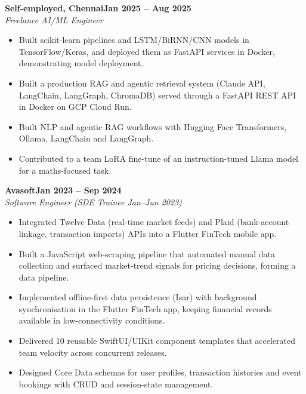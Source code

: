 \documentclass[a4paper,11pt]{article}
\newcommand{\entry}[4]{\needspace{4\baselineskip}\noindent\textbf{#1}\hfill\textbf{#2}\\ \textit{#3}\hfill\textit{#4}\par}
\begin{document}
\vspace{4pt}
\entry{Self-employed, Chennai}{Jan 2025 – Aug 2025}{Freelance AI/ML Engineer}{}
\begin{itemize}
  \item Built scikit-learn pipelines and LSTM/BiRNN/CNN models in TensorFlow/Keras, and deployed them as FastAPI services in Docker, demonstrating model deployment.
  \item Built a production RAG and agentic retrieval system (Claude API, LangChain, LangGraph, ChromaDB) served through a FastAPI REST API in Docker on GCP Cloud Run.
  \item Built NLP and agentic RAG workflows with Hugging Face Transformers, Ollama, LangChain and LangGraph.
  \item Contributed to a team LoRA fine-tune of an instruction-tuned Llama model for a maths-focused task.
\end{itemize}
\vspace{4pt}
\entry{Avasoft}{Jan 2023 – Sep 2024}{Software Engineer (SDE Trainee Jan–Jun 2023)}{}
\begin{itemize}
  \item Integrated Twelve Data (real-time market feeds) and Plaid (bank-account linkage, transaction imports) APIs into a Flutter FinTech mobile app.
  \item Built a JavaScript web-scraping pipeline that automated manual data collection and surfaced market-trend signals for pricing decisions, forming a data pipeline.
  \item Implemented offline-first data persistence (Isar) with background synchronisation in the Flutter FinTech app, keeping financial records available in low-connectivity conditions.
  \item Delivered 10 reusable SwiftUI/UIKit component templates that accelerated team velocity across concurrent releases.
  \item Designed Core Data schemas for user profiles, transaction histories and event bookings with CRUD and session-state management.
\end{itemize}

\end{document}
